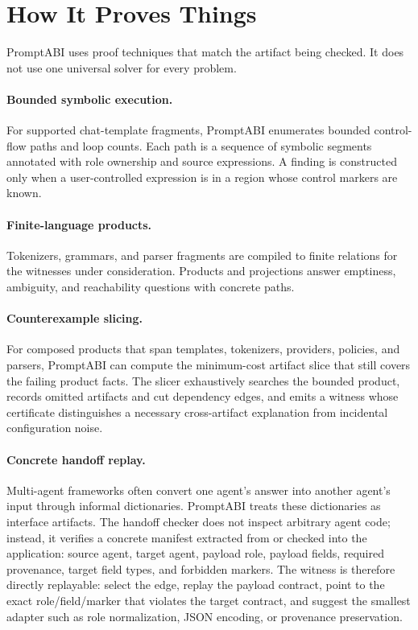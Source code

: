 \documentclass[10pt]{article}
\begin{document}
\section{How It Proves Things}

PromptABI uses proof techniques that match the artifact being checked. It does
not use one universal solver for every problem.

\paragraph{Bounded symbolic execution.}
For supported chat-template fragments, PromptABI enumerates bounded control-flow
paths and loop counts. Each path is a sequence of symbolic segments annotated
with role ownership and source expressions. A finding is constructed only when a
user-controlled expression is in a region whose control markers are known.

\paragraph{Finite-language products.}
Tokenizers, grammars, and parser fragments are compiled to finite relations for
the witnesses under consideration. Products and projections answer emptiness,
ambiguity, and reachability questions with concrete paths.

\paragraph{Counterexample slicing.}
For composed products that span templates, tokenizers, providers, policies, and
parsers, PromptABI can compute the minimum-cost artifact slice that still covers
the failing product facts. The slicer exhaustively searches the bounded product,
records omitted artifacts and cut dependency edges, and emits a witness whose
certificate distinguishes a necessary cross-artifact explanation from incidental
configuration noise.

\paragraph{Concrete handoff replay.}
Multi-agent frameworks often convert one agent's answer into another agent's
input through informal dictionaries. PromptABI treats these dictionaries as
interface artifacts. The handoff checker does not inspect arbitrary agent code;
instead, it verifies a concrete manifest extracted from or checked into the
application: source agent, target agent, payload role, payload fields, required
provenance, target field types, and forbidden markers. The witness is therefore
directly replayable: select the edge, replay the payload contract, point to the
exact role/field/marker that violates the target contract, and suggest the
smallest adapter such as role normalization, JSON encoding, or provenance
preservation.
\end{document}
